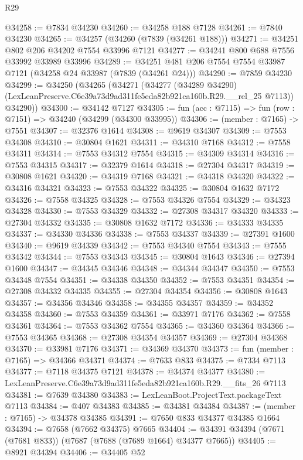\begin{lexlean}{R29}
\begin{coremodule}
@34258 := @7834 @34230
@34260 := @34258 @188 @7128
@34261 := @7840 @34230
@34265 := @34257 (@34260 (@7839 (@34261 @188)))
@34271 := @34251 @802 @206 @34202 @7554 @33996 @7121
@34277 := @34241 @800 @688 @7556 @33992 @33989 @33996
@34289 := @34251 @481 @206 @7554 @7554 @33987 @7121 (@34258 @24 @33987 (@7839 (@34261 @24)))
@34290 := @7859 @34230
@34299 := @34250
    (@34265
      (@34271
        (@34277
          (@34289 @34290)
          (LexLeanPreserve.C6e39a73d9ad311fe5eda82b921ca160b.R29.__rel_25 @7113))
        @34290))
@34300 := @34142 @7127
@34305 := fun (acc : @7115) => fun (row : @7151) => @34240 (@34299 (@34300 @33995))
@34306 := (member : @7165) -> @7551
@34307 := @32376 @1614
@34308 := @9619 @34307
@34309 := @7553 @34308
@34310 := @30804 @1621
@34311 := @34310 @7168
@34312 := @7558 @34311
@34314 := @7553 @34312 @7554
@34315 := @34309 @34314
@34316 := @7553 @34315
@34317 := @32379 @1614
@34318 := @27304 @34317
@34319 := @30808 @1621
@34320 := @34319 @7168
@34321 := @34318 @34320
@34322 := @34316 @34321
@34323 := @7553 @34322
@34325 := @30804 @1632 @7172
@34326 := @7558 @34325
@34328 := @7553 @34326 @7554
@34329 := @34323 @34328
@34330 := @7553 @34329
@34332 := @27308 @34317 @34320
@34333 := @27304 @34332
@34335 := @30808 @1632 @7172
@34336 := @34333 @34335
@34337 := @34330 @34336
@34338 := @7553 @34337
@34339 := @27391 @1600
@34340 := @9619 @34339
@34342 := @7553 @34340 @7554
@34343 := @7555 @34342
@34344 := @7553 @34343
@34345 := @30804 @1643
@34346 := @27394 @1600
@34347 := @34345 @34346
@34348 := @34344 @34347
@34350 := @7553 @34348 @7554
@34351 := @34338 @34350
@34352 := @7553 @34351
@34354 := @27308 @34332 @34335
@34355 := @27304 @34354
@34356 := @30808 @1643
@34357 := @34356 @34346
@34358 := @34355 @34357
@34359 := @34352 @34358
@34360 := @7553 @34359
@34361 := @33971 @7176
@34362 := @7558 @34361
@34364 := @7553 @34362 @7554
@34365 := @34360 @34364
@34366 := @7553 @34365
@34368 := @27308 @34354 @34357
@34369 := @27304 @34368
@34370 := @33981 @7176
@34371 := @34369 @34370
@34373 := fun (member : @7165) => @34366 @34371
@34374 := @7633 @833
@34375 := @7334 @7113
@34377 := @7118 @34375 @7121
@34378 := @34374 @34377
@34380 := LexLeanPreserve.C6e39a73d9ad311fe5eda82b921ca160b.R29.__fits_26 @7113
@34381 := @7639 @34380
@34383 := LexLeanBoot.ProjectText.packageText @7113
@34384 := @407 @34383
@34385 := @34381 @34384
@34387 := (member : @7165) -> @34378 @34385
@34391 := @7650 @833 @34377 @34385 @1664
@34394 := @7658 (@7662 @34375) @7665
@34404 := @34391 @34394 (@7671 (@7681 @833)) (@7687 (@7688 (@7689 @1664) @34377 @7665))
@34405 := @8921 @34394
@34406 := @34405 @52

\end{coremodule}
\end{lexlean}
